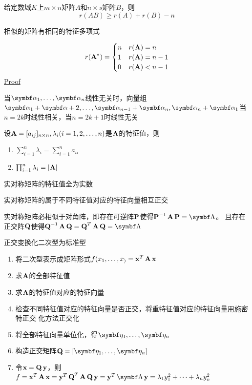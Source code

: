 \documentclass{article}
\begin{document}
给定数域\(K\)上\(m\times n\)矩阵\(A\)和\(n\times s\)矩阵\(B\)，则
\begin{equation*}
r(AB)\ge r(A)+r(B)-n
\end{equation*}

相似的矩阵有相同的特征多项式

\begin{equation*}
r(\operatorname{\textbf{A}}^*)=
\begin{cases}
n&r(\operatorname{\textbf{A}})=n\\
1&r(\operatorname{\textbf{A}})=n-1\\
0&r(\operatorname{\textbf{A}})<n-1
\end{cases}
\end{equation*}
\href{https://math.stackexchange.com/questions/410402/for-given-n-times-n-matrix-a-singular-matrix-prove-that-operatornamerank/410415\#410415}{Proof}

当\(\balpha_1,\dots,\balpha_n\)线性无关时，向量组
\(\balpha_1+\balpha+2,\dots,\balpha_{n-1}+\balpha_n, \balpha_n+\balpha_1\)当
\(n=2k\)时线性相关，当\(n=2k+1\)时线性无关

设\(\operatorname{\textbf{A}}=[a_{ij}]_{n\times n},\lambda_i(i=1,2,\dots,n)\)是\(\operatorname{\textbf{A}}\)的特征值，则
\begin{enumerate}
\item \(\sum_{i=1}^n\lambda_i=\sum_{i=1}^na_{ii}\)
\item \(\prod_{i=1}^n\lambda_i=\abs{\bA}\)
\end{enumerate}


\begin{theorem}[]
实对称矩阵的特征值全为实数
\end{theorem}

\begin{theorem}[]
实对称矩阵的属于不同特征值对应的特征向量相互正交
\end{theorem}

\begin{theorem}[]
实对称矩阵必相似于对角阵，即存在可逆阵\(\operatorname{\textbf{P}}\)使得\(\bP^{-1}\bA\bP=\bLambda\)。
且存在正交阵\(\operatorname{\textbf{Q}}\)使得\(\bQ^{-1}\bA\bQ=\bQ^T\bA\bQ=\bLambda\)
\end{theorem}


正交变换化二次型为标准型
\begin{enumerate}
\item 将二次型表示成矩阵形式\(f(x_1,\dots,x_)=\operatorname{\textbf{x}}^T\operatorname{\textbf{A}}\operatorname{\textbf{x}}\)
\item 求\(\operatorname{\textbf{A}}\)的全部特征值
\item 求\(\operatorname{\textbf{A}}\)的特征值对应的特征向量
\item 检查不同特征值对应的特征向量是否正交，将重特征值对应的特征向量用施密特正交
化方法正交化
\item 将全部特征向量单位化，得\(\boldeta_1,\dots,\boldeta_n\)
\item 构造正交矩阵\(\bQ=[\boldeta_1,\dots,\boldeta_n]\)
\item 令\(\operatorname{\textbf{x}}=\operatorname{\textbf{Q}}\operatorname{\textbf{y}}\)，则\(f=\bx^T\bA\bx=\by^T\bQ^T\bA\bQ\by=\by^T\bLambda\by=
      \lambda_1y_1^2+\dots+\lambda_ny_n^2\)
\end{enumerate}
\end{document}
